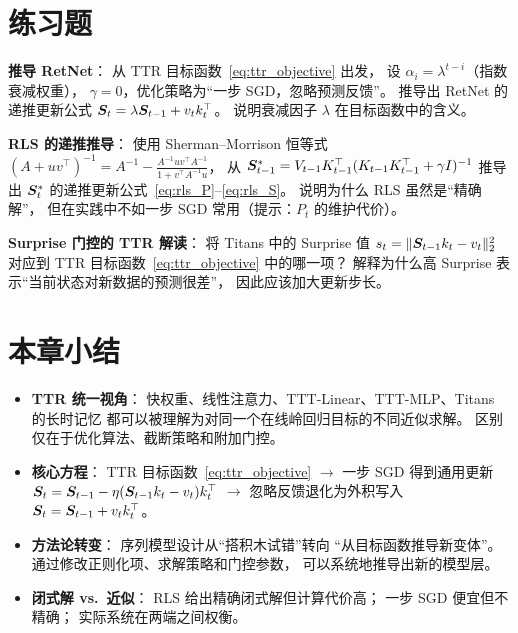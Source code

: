 \section{练习题}
\label{sec:ttr_exercises}

\begin{exercise}
\textbf{推导 RetNet}：
从 TTR 目标函数~\eqref{eq:ttr_objective} 出发，
设 $\alpha_i = \lambda^{t-i}$（指数衰减权重），
$\gamma = 0$，优化策略为``一步 SGD，忽略预测反馈''。
推导出 RetNet 的递推更新公式
$\boldsymbol{S}_t = \lambda \boldsymbol{S}_{t-1} + v_t k_t^\top$。
说明衰减因子 $\lambda$ 在目标函数中的含义。
\end{exercise}

\begin{exercise}
\textbf{RLS 的递推推导}：
使用 Sherman--Morrison 恒等式
$(A + uv^\top)^{-1} = A^{-1} - \frac{A^{-1} u v^\top A^{-1}}{1 + v^\top A^{-1} u}$，
从 $\boldsymbol{S}_{t-1}^* = V_{t-1} K_{t-1}^\top (K_{t-1} K_{t-1}^\top + \gamma I)^{-1}$
推导出 $\boldsymbol{S}_t^*$ 的递推更新公式~\eqref{eq:rls_P}--\eqref{eq:rls_S}。
说明为什么 RLS 虽然是``精确解''，
但在实践中不如一步 SGD 常用（提示：$P_t$ 的维护代价）。
\end{exercise}

\begin{exercise}
\textbf{Surprise 门控的 TTR 解读}：
将 Titans 中的 Surprise 值 $s_t = \|\boldsymbol{S}_{t-1} k_t - v_t\|_2^2$
对应到 TTR 目标函数~\eqref{eq:ttr_objective} 中的哪一项？
解释为什么高 Surprise 表示``当前状态对新数据的预测很差''，
因此应该加大更新步长。
\end{exercise}

\section{本章小结}
\label{sec:ttr_summary}

\begin{itemize}
  \item \textbf{TTR 统一视角}：
    快权重、线性注意力、TTT-Linear、TTT-MLP、Titans 的长时记忆
    都可以被理解为对同一个在线岭回归目标的不同近似求解。
    区别仅在于优化算法、截断策略和附加门控。

  \item \textbf{核心方程}：
    TTR 目标函数~\eqref{eq:ttr_objective}
    $\to$ 一步 SGD 得到通用更新 $\boldsymbol{S}_t = \boldsymbol{S}_{t-1} - \eta(\boldsymbol{S}_{t-1} k_t - v_t) k_t^\top$
    $\to$ 忽略反馈退化为外积写入 $\boldsymbol{S}_t = \boldsymbol{S}_{t-1} + v_t k_t^\top$。

  \item \textbf{方法论转变}：
    序列模型设计从``搭积木试错''转向
    ``从目标函数推导新变体''。
    通过修改正则化项、求解策略和门控参数，
    可以系统地推导出新的模型层。

  \item \textbf{闭式解 vs.\ 近似}：
    RLS 给出精确闭式解但计算代价高；
    一步 SGD 便宜但不精确；
    实际系统在两端之间权衡。
\end{itemize}

